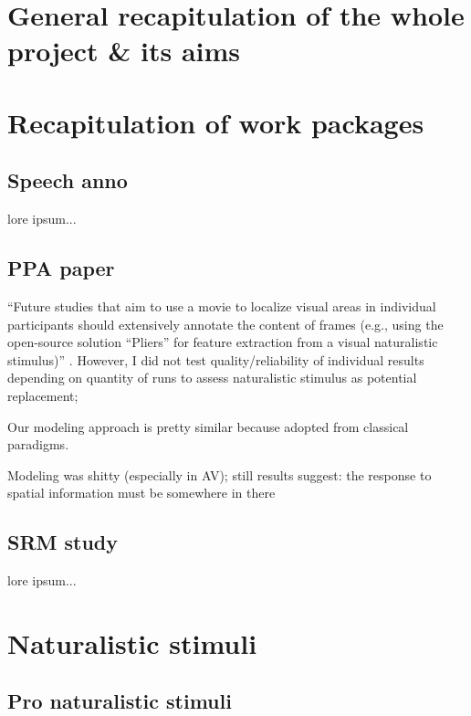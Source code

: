\section{General recapitulation of the whole project \& its aims}



\section{Recapitulation of work packages}



\subsection{Speech anno}

lore ipsum...


\subsection{PPA paper}
%
``Future studies that aim to use a movie to localize visual areas in individual
participants should extensively annotate the content of frames (e.g., using the
open-source solution ``Pliers''\citep{mcnamara2017developing} for feature
extraction from a visual naturalistic stimulus)''
\citep{haeusler2022processing}.
%
However, I did not test quality/reliability of individual results depending on
quantity of runs to assess naturalistic stimulus as potential replacement;

%
Our modeling approach is pretty similar because adopted from classical
paradigms.

%
Modeling was shitty (especially in AV);
%
still results suggest: the response to spatial information must be somewhere in
there


\subsection{SRM study}

lore ipsum...


\section{Naturalistic stimuli}

\subsection{Pro naturalistic stimuli}

